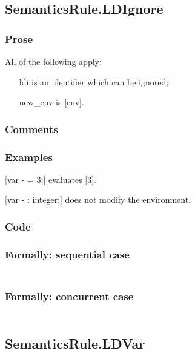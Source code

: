 \documentclass{book}
\begin{document}
\subsection{SemanticsRule.LDIgnore \label{sec:SemanticsRule.LDIgnore}}

    \subsubsection{Prose}
    All of the following apply:
    \begin{itemize}
    \item [ldi] is an identifier which can be ignored;
    \item [new\_env] is [env].
    \end{itemize}

    \subsubsection{Comments}

    \subsubsection{Examples}
    [var - = 3;] evaluates [3].

    [var - : integer;] does not modify the environment.

  \subsubsection{Code}

  \subsubsection{Formally: sequential case}
  \begin{align}
  \end{align} 

  \subsubsection{Formally: concurrent case}
  \begin{align}
  \end{align} 

\subsection{SemanticsRule.LDVar \label{sec:SemanticsRule.LDVar}}
\end{document}
